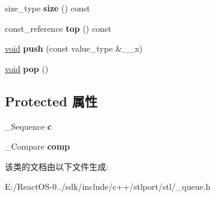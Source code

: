 \begin{DoxyCompactItemize}
size\+\_\+type {\bfseries size} () const
\item 
\mbox{\label{classpriority__queue_a88a3ca06ca74d39f10ab19c5f83bb477}} 
const\+\_\+reference {\bfseries top} () const
\item 
\mbox{\label{classpriority__queue_a8b75b2c088db7df2561e3eb81ef76c9c}} 
\hyperlink{interfacevoid}{void} {\bfseries push} (const value\+\_\+type \&\+\_\+\+\_\+x)
\item 
\mbox{\label{classpriority__queue_aa29bd4d9c24313b2f17e6164645cb084}} 
\hyperlink{interfacevoid}{void} {\bfseries pop} ()
\end{DoxyCompactItemize}
\subsection*{Protected 属性}
\begin{DoxyCompactItemize}
\item 
\mbox{\label{classpriority__queue_af421469b87aa0f8592c19d5dce865f65}} 
\+\_\+\+Sequence {\bfseries c}
\item 
\mbox{\label{classpriority__queue_aded4703f9f9a5ebca9b0ceef256644d4}} 
\+\_\+\+Compare {\bfseries comp}
\end{DoxyCompactItemize}


该类的文档由以下文件生成\+:\begin{DoxyCompactItemize}
\item 
E\+:/\+React\+O\+S-\/0../sdk/include/c++/stlport/stl/\+\_\+queue.\+h\end{DoxyCompactItemize}
